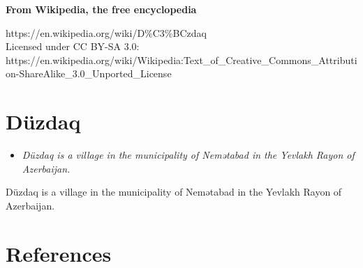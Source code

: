 \textbf{From Wikipedia, the free encyclopedia}

https://en.wikipedia.org/wiki/D\%C3\%BCzdaq\\
Licensed under CC BY-SA 3.0:\\
https://en.wikipedia.org/wiki/Wikipedia:Text\_of\_Creative\_Commons\_Attribution-ShareAlike\_3.0\_Unported\_License

\section{Düzdaq}\label{duxfczdaq}

\begin{itemize}
\item
  \emph{Düzdaq is a village in the municipality of Nemətabad in the
  Yevlakh Rayon of Azerbaijan.}
\end{itemize}

Düzdaq is a village in the municipality of Nemətabad in the Yevlakh
Rayon of Azerbaijan.

\section{References}\label{references}
